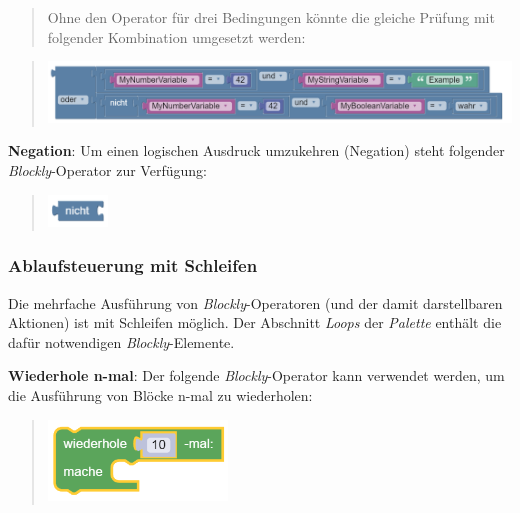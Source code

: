 \documentclass[
  letterpaper,
  DIV=11]{scrreprt}
\begin{document}
\begin{tcolorbox}
\begin{quote}
Ohne den Operator für drei Bedingungen könnte die gleiche Prüfung mit
folgender Kombination umgesetzt werden:
\end{quote}

\begin{quote}
\includegraphics[width=5.72917in,height=\textheight]{img/screenshot-blockly-element-if-iftrue-iffalse-example-02-DEU.png}
\end{quote}

\textbf{Negation}: Um einen logischen Ausdruck umzukehren (Negation)
steht folgender \emph{Blockly}-Operator zur Verfügung:

\begin{quote}
\includegraphics[width=0.625in,height=\textheight]{img/screenshot-blockly-element-negation-01-DEU.png}
\end{quote}

\hypertarget{ablaufsteuerung-mit-schleifen-1}{%
\subsubsection{Ablaufsteuerung mit
Schleifen}\label{ablaufsteuerung-mit-schleifen-1}}

Die mehrfache Ausführung von \emph{Blockly}-Operatoren (und der damit
darstellbaren Aktionen) ist mit Schleifen möglich. Der Abschnitt
\emph{Loops} der \emph{Palette} enthält die dafür notwendigen
\emph{Blockly}-Elemente.

\textbf{Wiederhole n-mal}: Der folgende \emph{Blockly}-Operator kann
verwendet werden, um die Ausführung von Blöcke n-mal zu wiederholen:

\begin{quote}
\includegraphics[width=1.875in,height=\textheight]{img/screenshot-blockly-loop-repeat-n-times-01-DEU.png}
\end{quote}


\end{tcolorbox}
\end{document}
